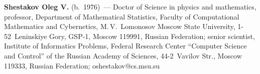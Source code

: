 

\Contrl

\noindent
\textbf{Shestakov Oleg V.} (b.\ 1976)~--- 
Doctor of Science in physics and mathematics, professor, Department of 
Mathematical Statistics, Faculty of Computational Mathematics and Cybernetics, 
M.\,V.~Lomonosov Moscow State University, 1-52~Leninskiye Gory, GSP-1, Moscow 119991, 
Russian Federation; senior scientist, 
Institute of Informatics Problems, Federal Research Center ``Computer Science and Control'' 
of the Russian Academy of Sciences, 44-2~Vavilov Str., Moscow 119333, Russian Federation; \mbox{oshestakov@cs.msu.su}


\label{end\stat}

\renewcommand{\bibname}{\protect\rm Литература}  
   